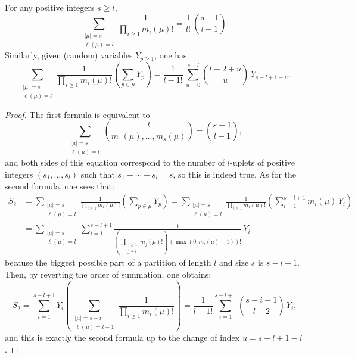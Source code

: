 \documentclass[10pt]{amsart}
\begin{document}
\begin{lemma}\label{idenpart}
For any positive integers $s\geq l$,
$$\sum_{\substack{|\mu|=s\\ \ell(\mu)=l}}\frac{1}{\prod_{i \geq 1}m_{i}(\mu)!}=\frac{1}{l!}\,\binom{s-1}{l-1}.$$
Similarly, given (random) variables $Y_{p\geq 1}$, one has
$$\sum_{\substack{|\mu|=s\\ \ell(\mu)=l}}\frac{1}{\prod_{i \geq 1}m_{i}(\mu)!}\left(\sum_{p \in \mu}Y_{p}\right)=\frac{1}{l-1!}\,\sum_{u=0}^{s-l} \binom{l-2+u}{u}\,Y_{s-l+1-u}.$$
\end{lemma}
\begin{proof}
The first formula is equivalent to
$$\sum_{\substack{|\mu|=s\\ \ell(\mu)=l}}\binom{l}{m_{1}(\mu),\ldots,m_{s}(\mu)}=\binom{s-1}{l-1},$$
and both sides of this equation correspond to the number of $l$-uplets of positive integers $(s_{1},\ldots,s_{l})$ such that $s_{1}+\cdots+s_{l}=s$, so this is indeed true. As for the second formula, one sees that:
\begin{align*}S_{2}&=\sum_{\substack{|\mu|=s\\ \ell(\mu)=l}}\frac{1}{\prod_{i \geq 1}m_{i}(\mu)!}\left(\sum_{p \in \mu}Y_{p}\right)=\sum_{\substack{|\mu|=s\\ \ell(\mu)=l}}\frac{1}{\prod_{i \geq 1}m_{i}(\mu)!}\left(\sum_{i=1}^{s-l+1}m_{i}(\mu)\,Y_{i}\right)\\
&=\sum_{\substack{|\mu|=s\\ \ell(\mu)=l}}\sum_{i=1}^{s-l+1}\frac{1}{\left(\prod_{\substack{j \geq 1\\ j \neq i}}m_{j}(\mu)!\right)\,(\max(0,m_{i}(\mu)-1))!}\,Y_{i}
\end{align*}
because the biggest possible part of a partition of length $l$ and size $s$ is $s-l+1$. Then, by reverting the order of summation, one obtains:
$$S_{2}=\sum_{i=1}^{s-l+1}Y_{i}\left(\sum_{\substack{|\mu|=s-i\\\ell(\mu)=l-1}} \frac{1}{\prod_{i \geq 1}m_{i}(\mu)!}\right)=\frac{1}{l-1!}\sum_{i=1}^{s-l+1}\binom{s-i-1}{l-2}\,Y_{i},$$
and this is exactly the second formula up to the change of index $u=s-l+1-i$.
\end{proof}\bigskip
\end{document}
